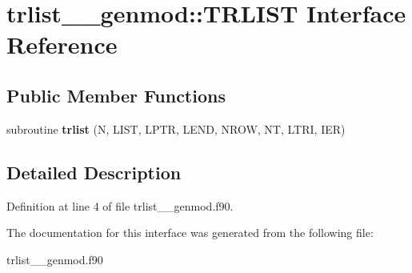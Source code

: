 \hypertarget{interfacetrlist____genmod_1_1_t_r_l_i_s_t}{\section{trlist\+\_\+\+\_\+genmod\+:\+:T\+R\+L\+I\+S\+T Interface Reference}
\label{interfacetrlist____genmod_1_1_t_r_l_i_s_t}
}
\subsection*{Public Member Functions}
\begin{DoxyCompactItemize}
\item 
\hypertarget{interfacetrlist____genmod_1_1_t_r_l_i_s_t_aec31e167045985e9ed790ef856022b8a}{subroutine {\bfseries trlist} (N, L\+I\+S\+T, L\+P\+T\+R, L\+E\+N\+D, N\+R\+O\+W, N\+T, L\+T\+R\+I, I\+E\+R)}\label{interfacetrlist____genmod_1_1_t_r_l_i_s_t_aec31e167045985e9ed790ef856022b8a}

\end{DoxyCompactItemize}


\subsection{Detailed Description}


Definition at line 4 of file trlist\+\_\+\+\_\+genmod.\+f90.



The documentation for this interface was generated from the following file\+:\begin{DoxyCompactItemize}
\item 
trlist\+\_\+\+\_\+genmod.\+f90\end{DoxyCompactItemize}

